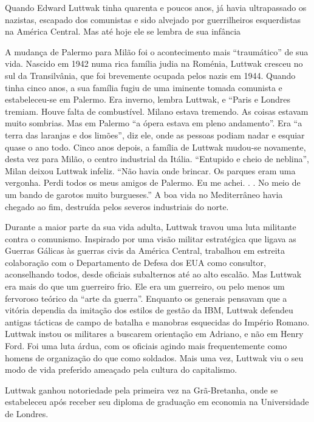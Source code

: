  \par 
Quando Edward Luttwak tinha quarenta e poucos anos, já havia ultrapassado os nazistas, escapado dos comunistas e sido alvejado por guerrilheiros esquerdistas na América Central. Mas até hoje ele se lembra de sua infância
 \par 
A mudança de Palermo para Milão foi o acontecimento mais “traumático” de sua vida. Nascido em 1942 numa rica família judia na Roménia, Luttwak cresceu no sul da Transilvânia, que foi brevemente ocupada pelos nazis em 1944. Quando tinha cinco anos, a sua família fugiu de uma iminente tomada comunista e estabeleceu-se em Palermo. Era inverno, lembra Luttwak, e “Paris e Londres tremiam. Houve falta de combustível. Milano estava tremendo. As coisas estavam muito sombrias. Mas em Palermo “a ópera estava em pleno andamento”. Era “a terra das laranjas e dos limões”, diz ele, onde as pessoas podiam nadar e esquiar quase o ano todo. Cinco anos depois, a família de Luttwak mudou-se novamente, desta vez para Milão, o centro industrial da Itália. “Entupido e cheio de neblina”, Milan deixou Luttwak infeliz. “Não havia onde brincar. Os parques eram uma vergonha. Perdi todos os meus amigos de Palermo. Eu me achei. . . No meio de um bando de garotos muito burgueses.” A boa vida no Mediterrâneo havia chegado ao fim, destruída pelos severos industriais do norte.
 \par 
Durante a maior parte da sua vida adulta, Luttwak travou uma luta militante contra o comunismo. Inspirado por uma visão militar estratégica que ligava as Guerras Gálicas às guerras civis da América Central, trabalhou em estreita colaboração com o Departamento de Defesa dos EUA como consultor, aconselhando todos, desde oficiais subalternos até ao alto escalão. Mas Luttwak era mais do que um guerreiro frio. Ele era um guerreiro, ou pelo menos um fervoroso teórico da “arte da guerra”. Enquanto os generais pensavam que a vitória dependia da imitação dos estilos de gestão da IBM, Luttwak defendeu antigas tácticas de campo de batalha e manobras esquecidas do Império Romano. Luttwak instou os militares a buscarem orientação em Adriano, e não em Henry Ford. Foi uma luta árdua, com os oficiais agindo mais frequentemente como homens de organização do que como soldados. Mais uma vez, Luttwak viu o seu modo de vida preferido ameaçado pela cultura do capitalismo.
 \par 
Luttwak ganhou notoriedade pela primeira vez na Grã-Bretanha, onde se estabeleceu após receber seu diploma de graduação em economia na Universidade de Londres.
 \par 
